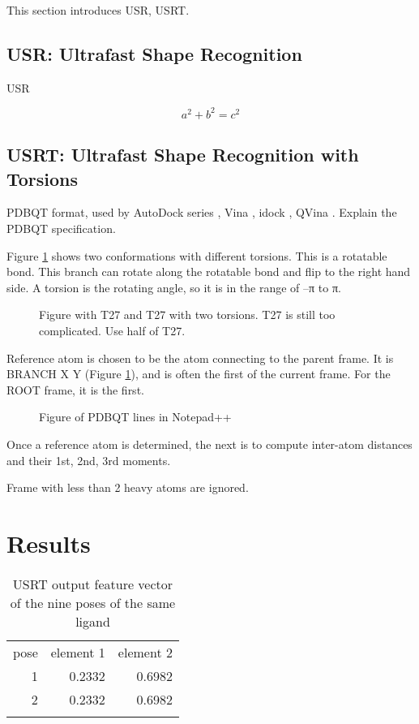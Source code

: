 \documentclass[twocolumn]{svjour3}          %
\begin{document}
This section introduces USR, USRT.

\subsection{USR: Ultrafast Shape Recognition}
\label{sec:usr}

USR \cite{1379}

\begin{equation}
a^2+b^2=c^2
\label{eqn:cyscore}
\end{equation}

\subsection{USRT: Ultrafast Shape Recognition with Torsions}
\label{sec:usrt}

PDBQT format, used by AutoDock series \cite{597,596}, Vina \cite{595}, idock \cite{1153}, QVina \cite{1193}. Explain the PDBQT specification.

Figure \ref{} shows two conformations with different torsions. This is a rotatable bond. This branch can rotate along the rotatable bond and flip to the right hand side. A torsion is the rotating angle, so it is in the range of –π to π. 

\begin{figure*}
\caption{Figure with T27 and T27 with two torsions. T27 is still too complicated. Use half of T27.}
\label{fig:2}
\end{figure*}

Reference atom is chosen to be the atom connecting to the parent frame. It is BRANCH X Y (Figure \ref{}), and is often the first of the current frame. For the ROOT frame, it is the first.

\begin{figure*}
\caption{Figure of PDBQT lines in Notepad++}
\label{fig:2}
\end{figure*}

Once a reference atom is determined, the next is to compute inter-atom distances and their 1st, 2nd, 3rd moments.

Frame with less than 2 heavy atoms are ignored.

\section{Results}

\begin{table}
\caption{USRT output feature vector of the nine poses of the same ligand}
\label{tab:1}
\begin{tabular}{rrr}
\hline\noalign{\smallskip}
pose & element 1 & element 2\\
\noalign{\smallskip}\hline\noalign{\smallskip}
1 & 0.2332 & 0.6982\\
2 & 0.2332 & 0.6982\\
\noalign{\smallskip}\hline
\end{tabular}
\end{table}
\end{document}
